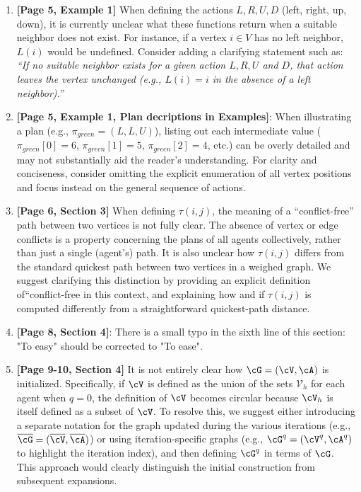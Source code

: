 \documentclass{article}
\newcommand{\beginquote}{``}
\begin{document}
\begin{enumerate}

   

\item \textbf{[Page 5, Example 1]} When defining the actions \(L, R, U, D\) (left, right, up, down), it is currently unclear what these functions return when a suitable neighbor does not exist. 
    For instance, if a vertex \(i \in V\) has no left neighbor, \(L(i)\) would be undefined. 
    Consider adding a clarifying statement such as:
    \emph{\beginquote If no suitable neighbor exists for a given action \(L,R,U\) and \(D\), that action leaves the vertex unchanged (e.g., \(L(i) = i\) in the absence of a left neighbor).''}


\item \textbf{[Page 5, Example 1, Plan decriptions in Examples]}:  When illustrating a plan (e.g., \(\pi_{green} = (L, L, U)\)), listing out each intermediate value 
    (\(\pi_{green}[0] = 6\), \(\pi_{green}[1] = 5\), \(\pi_{green}[2] = 4\), etc.) 
    can be overly detailed and may not substantially aid the reader's understanding. 
    For clarity and conciseness, consider omitting the explicit enumeration of all vertex positions 
    and focus instead on the general sequence of actions.

\item \textbf{[Page 6, Section 3]} 
    When defining \(\tau(i,j)\), the meaning of a \beginquote conflict-free'' path between two vertices is not fully clear. 
    The absence of vertex or edge conflicts is a property concerning the plans of all agents collectively, 
    rather than just a single (agent’s) path. It is also unclear how \(\tau(i,j)\) differs from the standard quickest path between two vertices in a weighed graph. 
    We suggest clarifying this distinction by providing an explicit definition of\beginquote conflict-free in this context, 
    and explaining how and if \(\tau(i,j)\) is computed differently from a straightforward quickest-path distance.

    
    \item \textbf{[Page 8, Section 4]}: There is a small typo in the sixth line of this section: "To easy" should be corrected to "To ease".


\item \textbf{[Page 9-10, Section 4]} 
    It is not entirely clear how \(\cG = (\cV, \cA)\) is initialized. 
    Specifically, if \(\cV\) is defined as the union of the sets \(\mathcal{V}_h\) for each agent when \(q=0\), 
    the definition of \(\cV\) becomes circular because \(\cV_h\) is itself defined as a subset of \(\cV\). 
    To resolve this, we suggest either introducing a separate notation 
    for the graph updated during the various iterations
    (e.g., \(\overline{\cG} = (\overline{\cV}, \overline{\cA})\)) 
    or using iteration-specific graphs 
    (e.g., \(\cG^q = (\cV^q, \cA^q)\) to highlight the iteration index), 
    and then defining \(\cG^q\) in terms of \({\cG}\). 
    This approach would clearly distinguish the initial construction from subsequent expansions.


\end{enumerate}
\end{document}
